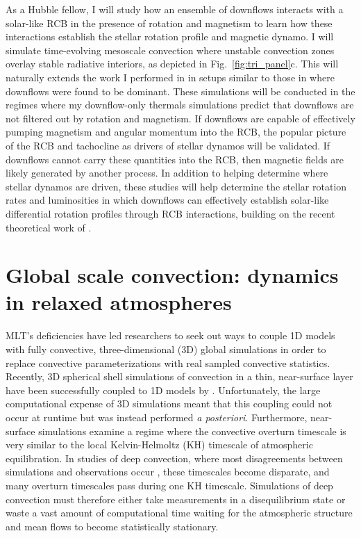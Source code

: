 \documentclass[preprint, hmargin=1in, vmargin=1in]{aastex62}
\begin{document}
As a Hubble fellow, I will study how an ensemble of downflows interacts with a solar-like RCB in the presence of rotation and magnetism to learn how these interactions establish the stellar rotation profile and magnetic dynamo.
I will simulate time-evolving mesoscale convection where unstable convection zones overlay stable radiative interiors, as depicted in Fig.~\ref{fig:tri_panel}c.
This will naturally extends the work I performed in \citep{anders&brown2017, anders&all2019} in setups similar to those in \citep{kapyla&all2017} where downflows were found to be dominant. 
These simulations will be conducted in the regimes where my downflow-only thermals simulations predict that downflows are not filtered out by rotation and magnetism.
If downflows are capable of effectively pumping magnetism and angular momentum into the RCB, the popular picture of the RCB and tachocline as drivers of stellar dynamos will be validated.
If downflows cannot carry these quantities into the RCB, then magnetic fields are likely generated by another process.
In addition to helping determine where stellar dynamos are driven, these studies will help determine the stellar rotation rates and luminosities in which downflows can effectively establish solar-like differential rotation profiles through RCB interactions, building on the recent theoretical work of \citep{wood&brummell2018}.

\section*{\textbf{Global scale convection: dynamics in relaxed atmospheres}}
MLT's deficiencies have led researchers to seek out ways to couple 1D models with fully convective, three-dimensional (3D) global simulations in order to replace convective parameterizations with real sampled convective statistics.
Recently, 3D spherical shell simulations of convection in a thin, near-surface layer have been successfully coupled to 1D models by \citet{jorgensen&weiss2019}.
Unfortunately, the large computational expense of 3D simulations meant that this coupling could not occur at runtime but was instead performed \emph{a posteriori}.
Furthermore, near-surface simulations examine a regime where the convective overturn timescale is very similar to the local Kelvin-Helmoltz (KH) timescale of atmospheric equilibration.
In studies of deep convection, where most disagreements between simulations and observations occur \citep{hanasoge&all2015}, these timescales become disparate, and many overturn timescales pass during one KH timescale.
Simulations of deep convection must therefore either take measurements in a disequilibrium state or waste a vast amount of computational time waiting for the atmospheric structure and mean flows to become statistically stationary.
\end{document}
